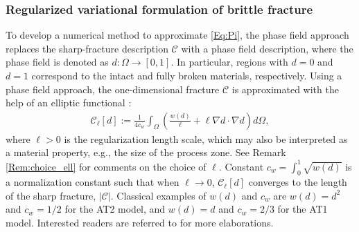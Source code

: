 \subsubsection{Regularized variational formulation of brittle fracture}
To develop a numerical method to approximate \eqref{Eq:Pi}, {the phase field approach replaces} the sharp-fracture description $\mathcal{C}$ with a phase field description, where the phase field is denoted as  $d:\Omega\rightarrow[0,1]$. In particular, regions with $d = 0$ and $d = 1$ correspond to the intact and fully broken materials, respectively. Using a phase field approach, the one-dimensional fracture $\mathcal{C}$ is approximated with the help of an elliptic %
functional \cite{ambrosio1990approximation, ambrosio1992approximation}:
\begin{equation}\label{Eq:Gamma_ell}
    \begin{aligned}
    \mathcal{C}_\ell[d]:=\frac{1}{4c_w}\int_\Omega\left(\frac{w(d)}{\ell} + \ell \nabla d\cdot\nabla d\right) d\Omega,  
    \end{aligned}
\end{equation}
where $\ell>0$ is the regularization length scale, which may also be interpreted as a material property, e.g., the size of the process zone. See Remark \ref{Rem:choice_ell} for comments on the choice of $\ell$. Constant $c_w=\int_{0}^{1} \sqrt{w(d)}$ is a normalization constant such that when $\ell\rightarrow 0$, {$\mathcal{C}_\ell[d]$} converges to the {length of the} sharp fracture{, $|\mathcal{C}|$}. Classical examples of $w(d)$ and $c_{w}$ are $w(d)=d^2$ and $c_{w}=1/2$ for the AT2 model, and $w(d)=d$ and $c_{w}=2/3$ for the AT1 model.  Interested readers are referred to \cite{tanne2018crack,Bourdin2014014301} %
for more elaborations. 

